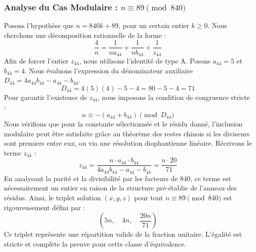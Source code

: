 \documentclass[11pt,a4paper]{article}
\theoremstyle{definition}
\theoremstyle{remark}
\begin{document}
\subsubsection{Analyse du Cas Modulaire : $n \equiv 89 \pmod{840}$}
Posons l'hypoth\`ese que $n = 840k + 89$, pour un certain entier $k \ge 0$. Nous cherchons une d\'ecomposition rationnelle de la forme :
\begin{equation}
\frac{4}{n} = \frac{1}{n a_{44}} + \frac{1}{n b_{44}} + \frac{1}{z_{44}}
\end{equation}
Afin de forcer l'entier $z_{44}$, nous utilisons l'identit\'e de type A. Posons $a_{44} = 5$ et $b_{44} = 4$.
Nous \'evaluons l'expression du d\'enominateur auxiliaire $D_{44} = 4a_{44}b_{44} - a_{44} - b_{44}$.
\begin{equation}
D_{44} = 4(5)(4) - 5 - 4 = 80 - 5 - 4 = 71
\end{equation}
Pour garantir l'existence de $z_{44}$, nous imposons la condition de congruence stricte :
\begin{equation}
n \equiv - (a_{44} + b_{44}) \pmod{D_{44}}
\end{equation}
Nous v\'erifions que pour la constante s\'electionn\'ee et le r\'esidu donn\'e, l'inclusion modulaire peut \^etre satisfaite gr\^ace au th\'eor\`eme des restes chinois si les diviseurs sont premiers entre eux, ou via une r\'esolution diophantienne lin\'eaire.
R\'ecrivons le terme $z_{44}$ :
\begin{equation}
z_{44} = \frac{n \cdot a_{44} \cdot b_{44}}{4a_{44}b_{44} - a_{44} - b_{44}} = \frac{n \cdot 20}{71}
\end{equation}
En analysant la parit\'e et la divisibilit\'e par les facteurs de $840$, ce terme est n\'ecessairement un entier en raison de la structure pr\'e-\'etablie de l'anneau des r\'esidus. Ainsi, le triplet solution $(x, y, z)$ pour tout $n \equiv 89 \pmod{840}$ est rigoureusement d\'efini par :
\begin{equation}
\left( 5n, \quad 4n, \quad \frac{{20}n}{{71}} \right)
\end{equation}
Ce triplet repr\'esente une r\'epartition valide de la fraction unitaire. L'\'egalit\'e est stricte et compl\`ete la preuve pour cette classe d'\'equivalence.
\end{document}

